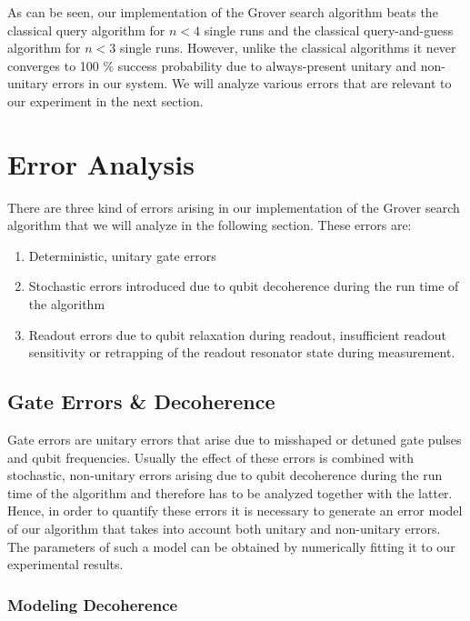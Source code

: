 As can be seen, our implementation of the Grover search algorithm beats the classical query algorithm for $n<4$ single runs and the classical query-and-guess algorithm for $n<3$ single runs. However, unlike the classical algorithms it never converges to 100 \% success probability due to always-present unitary and non-unitary errors in our system. We will analyze various errors that are relevant to our experiment in the next section.

\section{Error Analysis}

There are three kind of errors arising in our implementation of the Grover search algorithm that we will analyze in the following section. These errors are:

\begin{enumerate}
	\item Deterministic, unitary gate errors
	\item Stochastic errors introduced due to qubit decoherence during the run time of the algorithm
	\item Readout errors due to qubit relaxation during readout, insufficient readout sensitivity or retrapping of the readout resonator state during measurement.
\end{enumerate}

\subsection{Gate Errors \& Decoherence}

Gate errors are unitary errors that arise due to misshaped or detuned gate pulses and qubit frequencies. Usually the effect of these errors is combined with stochastic, non-unitary errors arising due to qubit decoherence during the run time of the algorithm and therefore has to be analyzed together with the latter. Hence, in order to quantify these errors it is necessary to generate an error model of our algorithm that takes into account both unitary and non-unitary errors. The parameters of such a model can be obtained by numerically fitting it to our experimental results. 

\subsubsection{Modeling Decoherence}

